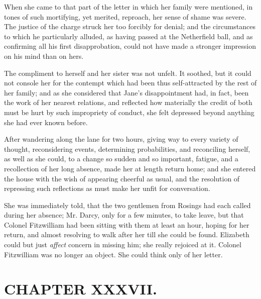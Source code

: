 When she came to that part of the letter in which her family were mentioned, in tones of such mortifying, yet merited, reproach, her sense of shame was severe. The justice of the charge struck her too forcibly for denial; and the circumstances to which he particularly alluded, as having passed at the Netherfield ball, and as confirming all his first disapprobation, could not have made a stronger impression on his mind than on hers.

The compliment to herself and her sister was not unfelt. It soothed, but it could not console her for the contempt which had been thus self-attracted by the rest of her family; and as she considered that Jane's disappointment had, in fact, been the work of her nearest relations, and reflected how materially the credit of both must be hurt by such impropriety of conduct, she felt depressed beyond anything she had ever known before.

After wandering along the lane for two hours, giving way to every variety of thought, reconsidering events, determining probabilities, and reconciling herself, as well as she could, to a change so sudden and so important, fatigue, and a recollection of her long absence, made her at length return home; and she entered the house with the wish of appearing cheerful as usual, and the resolution of repressing such reflections as must make her unfit for conversation.

She was immediately told, that the two gentlemen from Rosings had each called during her absence; Mr. Darcy, only for a few minutes, to take leave, but that Colonel Fitzwilliam had been sitting with them at least an hour, hoping for her return, and almost resolving to walk after her till she could be found. Elizabeth could but just \textit{affect} concern in missing him; she really rejoiced at it. Colonel Fitzwilliam was no longer an object. She could think only of her letter.



\chapter{CHAPTER XXXVII.}

